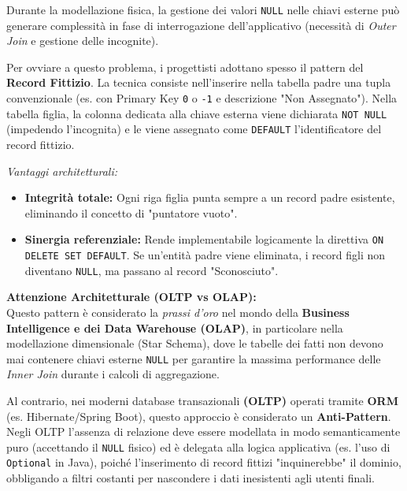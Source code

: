 \begin{dettagli}
Durante la modellazione fisica, la gestione dei valori \texttt{NULL} nelle chiavi esterne può generare complessità in fase di interrogazione dell'applicativo (necessità di \textit{Outer Join} e gestione delle incognite). 

Per ovviare a questo problema, i progettisti adottano spesso il pattern del \textbf{Record Fittizio}. La tecnica consiste nell'inserire nella tabella padre una tupla convenzionale (es. con Primary Key \texttt{0} o \texttt{-1} e descrizione "Non Assegnato"). 
Nella tabella figlia, la colonna dedicata alla chiave esterna viene dichiarata \texttt{NOT NULL} (impedendo l'incognita) e le viene assegnato come \texttt{DEFAULT} l'identificatore del record fittizio.

\textit{Vantaggi architetturali:}
\begin{itemize}
    \item \textbf{Integrità totale:} Ogni riga figlia punta sempre a un record padre esistente, eliminando il concetto di "puntatore vuoto".
    \item \textbf{Sinergia referenziale:} Rende implementabile logicamente la direttiva \texttt{ON DELETE SET DEFAULT}. Se un'entità padre viene eliminata, i record figli non diventano \texttt{NULL}, ma passano al record "Sconosciuto".
\end{itemize}

\smallskip

\textbf{Attenzione Architetturale (OLTP vs OLAP):} \\
Questo pattern è considerato la \textit{prassi d'oro} nel mondo della \textbf{Business Intelligence e dei Data Warehouse (OLAP)}, in particolare nella modellazione dimensionale (Star Schema), dove le tabelle dei fatti non devono mai contenere chiavi esterne \texttt{NULL} per garantire la massima performance delle \textit{Inner Join} durante i calcoli di aggregazione.

Al contrario, nei moderni database transazionali \textbf{(OLTP)} operati tramite \textbf{ORM} (es. Hibernate/Spring Boot), questo approccio è considerato un \textbf{Anti-Pattern}. Negli OLTP l'assenza di relazione deve essere modellata in modo semanticamente puro (accettando il \texttt{NULL} fisico) ed è delegata alla logica applicativa (es. l'uso di \texttt{Optional} in Java), poiché l'inserimento di record fittizi "inquinerebbe" il dominio, obbligando a filtri costanti per nascondere i dati inesistenti agli utenti finali.
\end{dettagli}

